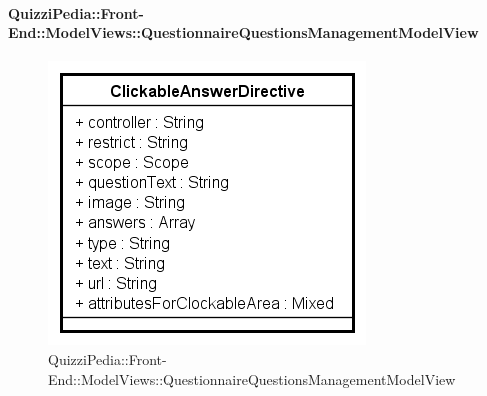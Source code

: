 \paragraph{QuizziPedia::Front-End::ModelViews::QuestionnaireQuestionsManagementModelView}
					
					\label{QuizziPedia::Front-End::ModelViews::QuestionnaireQuestionsManagementModelView}
					
					\begin{figure}[ht]
						\centering
						\includegraphics[scale=0.5,keepaspectratio]{UML/Classi/Front-End/QuizziPedia_Front-end_Templates_ClickableAnswerTemplate.png}
						\caption{QuizziPedia::Front-End::ModelViews::QuestionnaireQuestionsManagementModelView}
					\end{figure} \FloatBarrier
					
